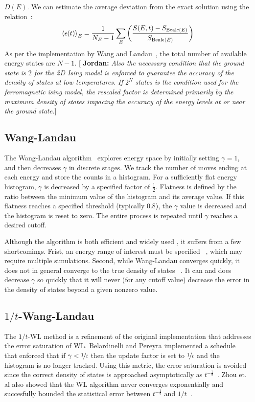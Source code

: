 \documentclass[letterpaper,twocolumn,amsmath,amssymb,pre,aps,10pt]{revtex4-1}
\newcommand{\blue}[1]{{\bf \color{blue} #1}}
\newcommand{\jpsays}[1]{{\color{red} [\blue{Jordan:} \emph{#1}]}}
\begin{document}
$D(E)$. We can estimate the average deviation from the exact solution
using the relation~\cite{schneider2017convergence, shakirov2018convergence,
barash2017control}:
\begin{align}
\braket{\epsilon(t)}_E = \frac{1}{N_E - 1} \sum_E \left( \frac{S(E,t) - S_{\text{Beale}(E)}}{S_{\text{Beale}(E)}} \right)
\end{align}
As per the implementation by Wang and
Landau~\cite{wang2001determining}, the total number of available energy
states are $N-1$.
\jpsays{Also the necessary condition that the ground state is
$2$ for the 2D Ising model is enforced to guarantee the accuracy of the
density of states at low temperatures. If $2^N$ states is the condition
used for the ferromagnetic ising model, the rescaled factor is
determined primarily by the maximum density of states impacing the
accuracy of the energy levels at or near the ground state.}


\subsection{Wang-Landau}
The Wang-Landau algorithm~\cite{wang2001efficient,wang2001determining,
landau2014guide} explores energy space by initially setting $\gamma=1$,
and then decreases $\gamma$ in discrete stages.  We track the number of
moves ending at each energy and store the counts in a histogram.  For a
sufficiently flat energy histogram, $\gamma$ is decreased by a specified factor of
$\frac12$.  Flatness is defined by the ratio between the minimum
value of the histogram and its average value.  If this flatness
reaches a specified threshold (typically 0.8), the $\gamma$ value is
decreased and the histogram is reset to zero. The entire process is repeated
until $\gamma$ reaches a desired cutoff.

Although the algorithm is both efficient and widely used , it
suffers from a few shortcomings.  Frist, an energy range of interest must be
specified ~\cite{wang2001efficient, schulz2003avoiding, yan2003fast},
which may require multiple simulations. Second, while Wang-Landau
converges quickly, it does not in general converge to the true density
of states ~\cite{belardinelli2008analysis, zhou2008optimal}.  It can
and does decrease $\gamma$ so quickly that it will never (for any
cutoff value) decrease the error in the density of states beyond a
given nonzero value.

\subsection{$1/t$-Wang-Landau}
The $1/t$-WL method is a refinement of the original implementation that
addresses the error saturation of WL. Belardinelli and Pereyra
implemented a schedule~\cite{belardinelli2007fast} that enforced that
if $\gamma < \nicefrac{1}{t}$ then the update factor is set to
$\nicefrac{1}{t}$ and the histogram is no longer tracked. Using this
metric, the error saturation is avoided since the correct density of
states is approached asymptotically as
$t^{-\frac12}$~\cite{belardinelli2008analysis}. Zhou et. al also showed
that the WL algorithm never converges exponentially and succesfully
bounded the statistical error between $t^{-\frac12}$ and
$1/t$~\cite{zhou2008optimal}.
\end{document}
